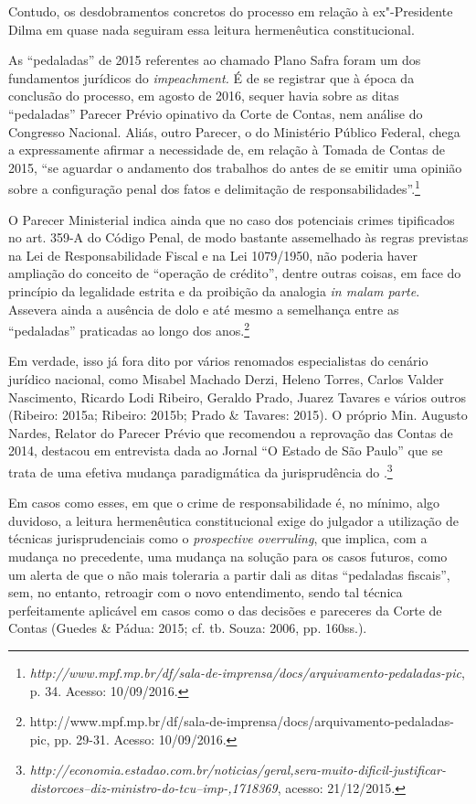 Contudo, os desdobramentos concretos do processo em relação à
ex"-Presidente Dilma em quase nada seguiram essa leitura hermenêutica
constitucional.

As ``pedaladas'' de 2015 referentes ao chamado Plano Safra foram um dos
fundamentos jurídicos do \emph{impeachment.} É de se registrar que à
época da conclusão do processo, em agosto de 2016, sequer havia sobre as
ditas ``pedaladas'' Parecer Prévio opinativo da Corte de Contas, nem
análise do Congresso Nacional. Aliás, outro Parecer, o do Ministério
Público Federal, chega a expressamente afirmar a necessidade de, em
relação à Tomada de Contas de 2015, ``se aguardar o andamento dos
trabalhos do  antes de se emitir uma opinião sobre a configuração
penal dos fatos e delimitação de responsabilidades''.\footnote{\emph{http://www.mpf.mp.br/df/sala-de-imprensa/docs/arquivamento-pedaladas-pic},
  p. 34. Acesso: 10/09/2016.}

O Parecer Ministerial indica ainda que no caso dos potenciais crimes
tipificados no art. 359-A do Código Penal, de modo bastante assemelhado
às regras previstas na Lei de Responsabilidade Fiscal e na Lei
1079/1950, não poderia haver ampliação do conceito de ``operação de
crédito'', dentre outras coisas, em face do princípio da legalidade
estrita e da proibição da analogia \emph{in malam parte}. Assevera ainda
a ausência de dolo e até mesmo a semelhança entre as ``pedaladas''
praticadas ao longo dos anos.\footnote{http://www.mpf.mp.br/df/sala-de-imprensa/docs/arquivamento-pedaladas-pic,
  pp. 29-31. Acesso: 10/09/2016.}

Em verdade, isso já fora dito por vários renomados especialistas do
cenário jurídico nacional, como Misabel Machado Derzi, Heleno Torres,
Carlos Valder Nascimento, Ricardo Lodi Ribeiro, Geraldo Prado, Juarez
Tavares e vários outros (Ribeiro: 2015a; Ribeiro: 2015b; Prado \&
Tavares: 2015). O próprio Min. Augusto Nardes, Relator do Parecer Prévio
que recomendou a reprovação das Contas de 2014, destacou em entrevista
dada ao Jornal ``O Estado de São Paulo'' que se trata de uma efetiva
mudança paradigmática da jurisprudência do .\footnote{\emph{http://economia.estadao.com.br/noticias/geral,sera-muito-dificil-justificar-distorcoes--diz-ministro-do-tcu--imp-,1718369},
  acesso: 21/12/2015.}

Em casos como esses, em que o crime de responsabilidade é, no mínimo,
algo duvidoso, a leitura hermenêutica constitucional exige do julgador a
utilização de técnicas jurisprudenciais como o \emph{prospective
overruling}, que implica, com a mudança no precedente, uma mudança na
solução para os casos futuros, como um alerta de que o  não mais
toleraria a partir dali as ditas ``pedaladas fiscais'', sem, no entanto,
retroagir com o novo entendimento, sendo tal técnica perfeitamente
aplicável em casos como o das decisões e pareceres da Corte de Contas
(Guedes \& Pádua: 2015; cf. tb. Souza: 2006, pp. 160ss.).

